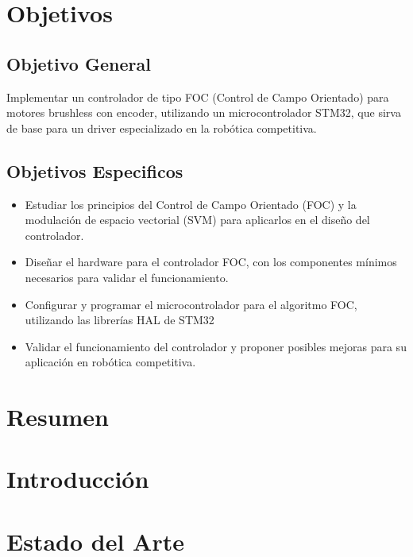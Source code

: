 \documentclass[11pt]{report}
\begin{document}
\normalsize
{}
\setcounter{page}{3}

\newpage
\tableofcontents




\newpage
\chapter*{Objetivos}
\section*{Objetivo General}
Implementar un controlador de tipo FOC (Control de Campo Orientado) para motores brushless con encoder, utilizando un microcontrolador STM32, que sirva de base para un driver especializado en la robótica competitiva.

\section*{Objetivos Especificos}
\begin{itemize}
	\item Estudiar los principios del Control de Campo Orientado (FOC) y la modulación de espacio vectorial (SVM) para aplicarlos en el diseño del controlador.
	\item Diseñar el hardware para el controlador FOC, con los componentes mínimos necesarios para validar el funcionamiento.
	\item Configurar y programar el microcontrolador para el algoritmo FOC, utilizando las librerías HAL de STM32
	\item Validar el funcionamiento del controlador y proponer posibles mejoras para su aplicación en robótica competitiva.
\end{itemize}

\newpage
\chapter*{Resumen}

\newpage
\chapter*{Introducción}

\newpage
\chapter{Estado del Arte}
\end{document}
